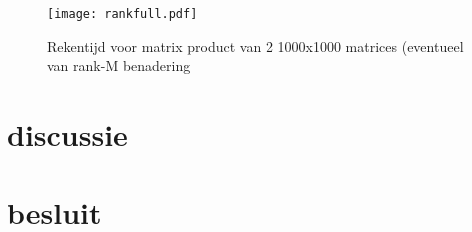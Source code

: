 \documentclass[a4paper]{article}
\begin{document}
\begin{figure}
\centering
	\texttt{[image: rankfull.pdf]}
	\caption{Rekentijd voor matrix product van 2 1000x1000 matrices (eventueel van rank-M benadering}
	\label{rankfull}
\end{figure}


\section*{discussie}
\section*{besluit}
\end{document}
